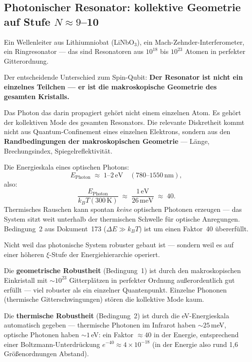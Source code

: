 \subsection{Photonischer Resonator: kollektive Geometrie auf Stufe
  \texorpdfstring{$N \approx 9$--10}{N≈9-10}}

Ein Wellenleiter aus Lithiumniobat (LiNbO$_3$),
ein Mach-Zehnder-Interferometer, ein Ringresonator ---
das sind Resonatoren aus $10^{18}$ bis $10^{23}$ Atomen
in perfekter Gitterordnung.

Der entscheidende Unterschied zum Spin-Qubit:
\textbf{Der Resonator ist nicht ein einzelnes Teilchen ---
er ist die makroskopische Geometrie des gesamten Kristalls.}

Das Photon das darin propagiert gehört nicht einem
einzelnen Atom. Es gehört der kollektiven Mode
des gesamten Resonators.
Die relevante Diskretheit kommt nicht aus
Quantum-Confinement eines einzelnen Elektrons,
sondern aus den \textbf{Randbedingungen der
makroskopischen Geometrie} --- Länge, Brechungsindex,
Spiegelreflektivität.

Die Energieskala eines optischen Photons:
\begin{equation}
  E_\text{Photon} \;\approx\; 1\text{--}2\,\text{eV}
  \quad (780\text{--}1550\,\text{nm}),
\end{equation}
also:
\begin{equation}
  \frac{E_\text{Photon}}{k_BT(300\,\text{K})}
  \;\approx\; \frac{1\,\text{eV}}{26\,\text{meV}}
  \;\approx\; 40.
\end{equation}
Thermisches Rauschen kann spontan \emph{keine} optischen
Photonen erzeugen --- das System sitzt weit unterhalb
der thermischen Schwelle für optische Anregungen.
Bedingung~2 aus Dokument~173 ($\Delta E \gg k_BT$)
ist um einen Faktor~40 übererfüllt.

\begin{important}
Nicht weil das photonische System robuster gebaut ist ---
sondern weil es auf einer höheren $\xi$-Stufe
der Energiehierarchie operiert.

Die \textbf{geometrische Robustheit} (Bedingung~1)
ist durch den makroskopischen Einkristall mit
$\sim 10^{23}$ Gitterplätzen in perfekter Ordnung
außerordentlich gut erfüllt ---
viel robuster als ein einzelner Quantenpunkt.
Einzelne Phononen (thermische Gitterschwingungen)
stören die kollektive Mode kaum.

Die \textbf{thermische Robustheit} (Bedingung~2)
ist durch die eV-Energieskala automatisch gegeben ---
thermische Photonen im Infrarot haben $\sim 25$\,meV,
optische Photonen haben $\sim 1$\,eV:
ein Faktor $\approx 40$ in der Energie, entsprechend einer
Boltzmann-Unterdrückung $e^{-40} \approx 4\times10^{-18}$
(in der Energie also rund 1{,}6 Größenordnungen Abstand).
\end{important}

